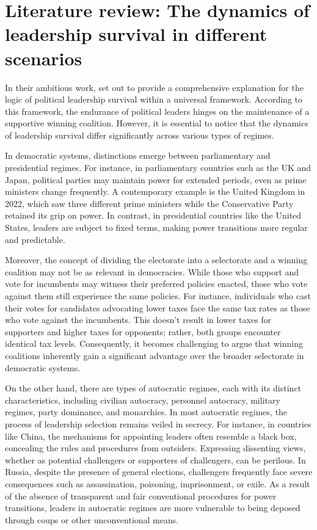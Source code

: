 \documentclass[
  12pt,
  a4paper,
  12pt]{article}
\begin{document}
\hypertarget{literature-review-the-dynamics-of-leadership-survival-in-different-scenarios}{%
\section{Literature review: The dynamics of leadership survival in
different
scenarios}\label{literature-review-the-dynamics-of-leadership-survival-in-different-scenarios}}

In their ambitious work, \citet{buenodemesquita2003} set out to provide
a comprehensive explanation for the logic of political leadership
survival within a universal framework. According to this framework, the
endurance of political leaders hinges on the maintenance of a supportive
winning coalition. However, it is essential to notice that the dynamics
of leadership survival differ significantly across various types of
regimes.

In democratic systems, distinctions emerge between parliamentary and
presidential regimes. For instance, in parliamentary countries such as
the UK and Japan, political parties may maintain power for extended
periods, even as prime ministers change frequently. A contemporary
example is the United Kingdom in 2022, which saw three different prime
ministers while the Conservative Party retained its grip on power. In
contrast, in presidential countries like the United States, leaders are
subject to fixed terms, making power transitions more regular and
predictable.

Moreover, the concept of dividing the electorate into a selectorate and
a winning coalition may not be as relevant in democracies. While those
who support and vote for incumbents may witness their preferred policies
enacted, those who vote against them still experience the same policies.
For instance, individuals who cast their votes for candidates advocating
lower taxes face the same tax rates as those who vote against the
incumbents. This doesn't result in lower taxes for supporters and higher
taxes for opponents; rather, both groups encounter identical tax levels.
Consequently, it becomes challenging to argue that winning coalitions
inherently gain a significant advantage over the broader selectorate in
democratic systems.

On the other hand, there are types of autocratic regimes, each with its
distinct characteristics, including civilian autocracy, personnel
autocracy, military regimes, party dominance, and monarchies. In most
autocratic regimes, the process of leadership selection remains veiled
in secrecy. For instance, in countries like China, the mechanisms for
appointing leaders often resemble a black box, concealing the rules and
procedures from outsiders. Expressing dissenting views, whether as
potential challengers or supporters of challengers, can be perilous. In
Russia, despite the presence of general elections, challengers
frequently face severe consequences such as assassination, poisoning,
imprisonment, or exile. As a result of the absence of transparent and
fair conventional procedures for power transitions, leaders in
autocratic regimes are more vulnerable to being deposed through coups or
other unconventional means.
\end{document}
